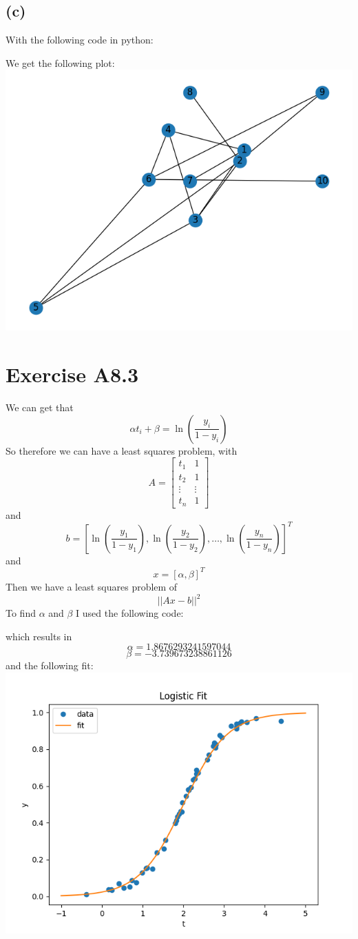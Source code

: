 \subsection*{(c)}
With the following code in python:

We get the following plot:\\
\includegraphics[scale=0.5]{fig1.png}
\section*{Exercise A8.3}
We can get that 
$$\alpha t_i+\beta=\ln(\frac{y_i}{1-y_i})$$
So therefore we can have a least squares problem, with
$$A=\begin{bmatrix}
t_1 & 1\\
t_2 & 1\\
\vdots & \vdots\\
t_n & 1
\end{bmatrix}$$
and 
$$b=[\ln(\frac{y_1}{1-y_1}),\ln(\frac{y_2}{1-y_2}),\dots,\ln(\frac{y_n}{1-y_n})]^T$$
and
$$x=[\alpha,\beta]^T$$
Then we have a least squares problem of 
$$||Ax-b||^2$$
To find $\alpha$ and $\beta$ I used the following code:

which results in
$$\alpha=1.8676293241597044$$
$$\beta=-3.739673238861126$$
and the following fit:\\  
\includegraphics[scale=0.5]{"fig2.png"}
